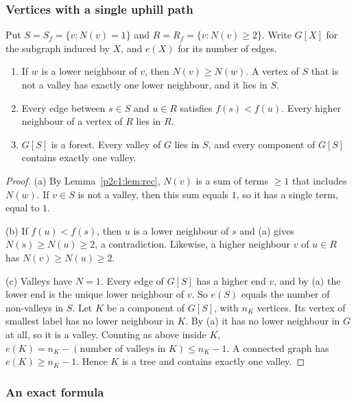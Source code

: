 \subsubsection{Vertices with a single uphill path}\label{p2c1:sec:S}

Put $S=S_f=\{v:N(v)=1\}$ and $R=R_f=\{v:N(v)\ge2\}$. Write $G[X]$ for the subgraph induced by
$X$, and $e(X)$ for its number of edges.

\begin{lemma}\label{p2c1:lem:S}
\begin{enumerate}[label=(\alph*)]
\item If $w$ is a lower neighbour of $v$, then $N(v)\ge N(w)$. A vertex of $S$ that is not a
  valley has exactly one lower neighbour, and it lies in $S$.
\item Every edge between $s\in S$ and $u\in R$ satisfies $f(s)<f(u)$. Every higher neighbour of
  a vertex of $R$ lies in $R$.
\item $G[S]$ is a forest. Every valley of $G$ lies in $S$, and every component of $G[S]$
  contains exactly one valley.
\end{enumerate}
\end{lemma}

\begin{proof}
(a) By Lemma~\ref{p2c1:lem:rec}, $N(v)$ is a sum of terms $\ge1$ that includes $N(w)$. If $v\in S$
is not a valley, then this sum equals $1$, so it has a single term, equal to $1$.

(b) If $f(u)<f(s)$, then $u$ is a lower neighbour of $s$ and (a) gives $N(s)\ge N(u)\ge2$, a
contradiction. Likewise, a higher neighbour $v$ of $u\in R$ has $N(v)\ge N(u)\ge2$.

(c) Valleys have $N=1$. Every edge of $G[S]$ has a higher end $v$, and by (a) the lower end is the
unique lower neighbour of $v$. So $e(S)$ equals the number of non-valleys in $S$. Let $K$ be a
component of $G[S]$, with $n_K$ vertices. Its vertex of smallest label has no lower neighbour in
$K$. By (a) it has no lower neighbour in $G$ at all, so it is a valley. Counting as above inside
$K$, $e(K)=n_K-(\text{number of valleys in }K)\le n_K-1$. A connected graph has $e(K)\ge n_K-1$.
Hence $K$ is a tree and contains exactly one valley.
\end{proof}

\subsubsection{An exact formula}\label{p2c1:sec:formula}

